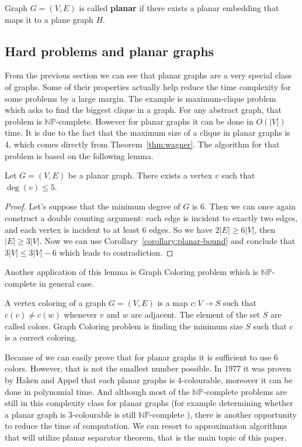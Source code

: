 \begin{defn}  \label{defn:planar}
    Graph $G = (V, E)$ is called \textbf{planar} if there exists a planar embedding that maps it to a plane graph $H$.
\end{defn}

\subsection{Hard problems and planar graphs}
From the previous section we can see that planar graphs are a very special class of graphs. Some of their properties actually help reduce 
the time complexity for some problems by a large margin. The example is maximum-clique problem which asks to find the biggest clique in 
a graph. For any abstract graph, that problem is $\mathbb{N}\mathbb{P}$-complete.
However for planar graphs it can be done in $O(|V|)$ time. It is due to the fact 
that the maximum size of a clique in planar graphs is 4, which comes directly from Theorem~\ref{thm:wagner}. 
The algorithm for that problem is based on the following lemma.
\begin{lemma} \label{lem:small-deg}
    Let $G = (V, E)$ be a planar graph. There exists a vertex $v$ such that $\deg(v) \leq 5$.
\end{lemma}
\begin{proof}
    Let's suppose that the minimum degree of $G$ is 6. Then we can once again construct a double counting argument:
    each edge is incident to exactly two edges, and each vertex is incident to at least 6 edges. So we have 
    $2|E| \geq 6|V|$, then $|E| \geq 3|V|$. Now we can use Corollary~\ref{corollary:planar-bound} and conclude that
    $3|V| \leq 3|V| - 6$ which leads to contradiction.
\end{proof}

Another application of this lemma is Graph Coloring problem which is $\mathbb{N}\mathbb{P}$-complete in general
case.
\begin{defn}
    A vertex coloring of a graph $G = (V, E)$ is a map $c \colon V \rightarrow S$ such that $c(v) \neq c(w)$
    whenever $v$ and $w$ are adjacent. The element of the set $S$ are called colors. Graph Coloring problem 
    is finding the minimum size $S$ such that $c$ is a correct coloring.
\end{defn}

Because of  we can easily prove that for planar graphs it is sufficient to use 6 colors. However, that is 
not the smallest number possible. In 1977 it was proven by Haken and Appel \cite{appel1977solution} that 
each planar graphs is $4$-colourable, moreover it can be done in polynomial time. 
And although most of the $\mathbb{N}\mathbb{P}$-complete problems are still in this complexity class for planar graphs 
(for example determining whether a planar graph is $3$-colourable is still $\mathbb{N}\mathbb{P}$-complete \cite{gareyJohnsonStockmeyer1976}), there is another opportunity
to reduce the time of computation. We can resort to approximation algorithms that will utilize planar separator theorem, that is the 
main topic of this paper.

